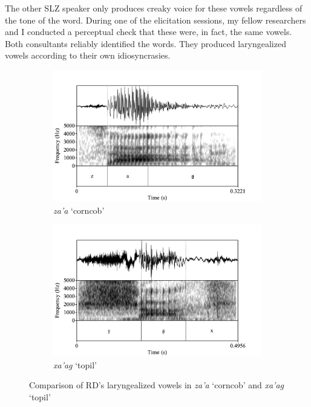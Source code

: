 \documentclass[12pt, letterpaper]{article}
\begin{document}
The other SLZ speaker only produces creaky voice for these vowels regardless of the tone of the word. During one of the elicitation sessions, my fellow researchers and I conducted a perceptual check that these were, in fact, the same vowels. Both consultants reliably identified the words. They produced laryngealized vowels according to their own idiosyncrasies.
\begin{figure}[!h]
	\centering
	\begin{subfigure}{.5\textwidth}
		\centering
		\includegraphics[width=\linewidth]{Images/RD_za'a.png}
		\caption{\textit{za'a} `corncob'}
		\label{fig:RDza'a}
	\end{subfigure}%
	\begin{subfigure}{.5\textwidth}
		\centering
		\includegraphics[width=\linewidth]{Images/RD_xa'ag.png}
		\caption{\textit{xa'ag} `topil'}
		\label{fig:RDxa'ag}
	\end{subfigure}
	\caption{Comparison of RD's laryngealized vowels in \textit{za'a} `corncob' and \textit{xa'ag} `topil'}
	\label{fig:RDLaryngeal}
\end{figure}
\end{document}
